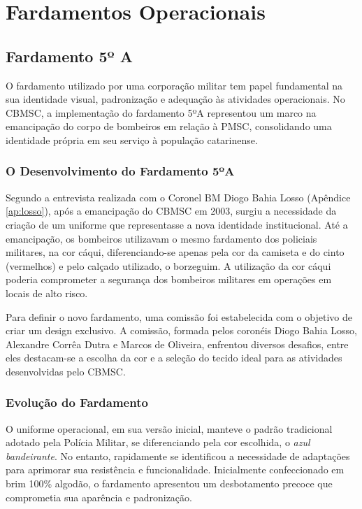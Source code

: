 \chapter{Fardamentos Operacionais}

\section{Fardamento 5º A}

O fardamento utilizado por uma corporação militar tem papel fundamental na sua identidade visual, 
padronização e adequação às atividades operacionais. No \acrfull{CBMSC}, a implementação do 
fardamento 5ºA representou um marco na emancipação do corpo de bombeiros em relação à \acrfull{PMSC}, 
consolidando uma identidade própria em seu serviço à população catarinense.

\subsection{O Desenvolvimento do Fardamento 5ºA}

Segundo a entrevista realizada com o Coronel BM Diogo Bahia Losso (Apêndice \ref{ap:losso}), após 
a emancipação do \acrshort{CBMSC} em 2003, surgiu a necessidade da criação de um uniforme que 
representasse a nova identidade institucional. Até a emancipação, os bombeiros utilizavam o mesmo fardamento
dos policiais militares, na cor cáqui, diferenciando-se apenas pela cor da camiseta e do cinto (vermelhos) 
e pelo calçado utilizado, o borzeguim. A utilização da cor cáqui poderia comprometer a segurança dos
bombeiros militares em operações em locais de alto risco.

Para definir o novo fardamento, uma comissão foi estabelecida com o objetivo de criar um design 
exclusivo. A comissão, formada pelos coronéis Diogo Bahia Losso, Alexandre Corrêa Dutra e Marcos
 de Oliveira, enfrentou diversos desafios, entre eles destacam-se a escolha da cor e a seleção 
 do tecido ideal para as atividades desenvolvidas pelo \acrshort{CBMSC}.

 \begin{centering}
\end{centering}

\subsection{Evolução do Fardamento}

O uniforme operacional, em sua versão inicial, manteve o padrão tradicional adotado pela Polícia 
Militar, se diferenciando pela cor escolhida, o \textit{azul bandeirante}. No entanto, rapidamente 
se identificou a necessidade de adaptações para aprimorar sua resistência e funcionalidade. 
Inicialmente confeccionado em brim 100\% algodão, o fardamento apresentou um desbotamento precoce
 que comprometia sua aparência e padronização.

